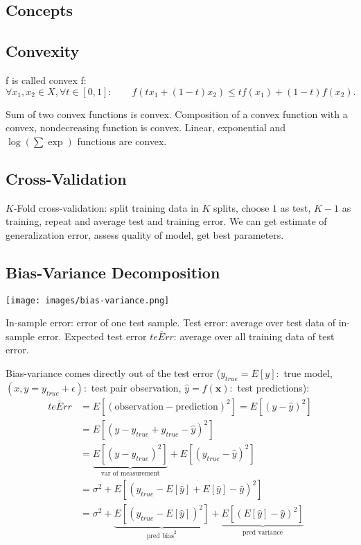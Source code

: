 \documentclass[10pt,a4paper,landscape]{article}
\renewcommand{\bf}[1]{\ensuremath{\mathbf{#1}}}
\begin{document}
\begin{multicols*}{4}
\section{Concepts}

\subsection{Convexity}
f is called convex f: $\forall x_1, x_2 \in X, \forall t \in [0, 1]: \qquad f(tx_1+(1-t)x_2)\leq t f(x_1)+(1-t)f(x_2).$

Sum of two convex functions is convex. Composition of a convex function with a convex, nondecreasing function is convex. Linear, exponential and $\log(\sum \exp)$ functions are convex.

\subsection{Cross-Validation}
$K$-Fold cross-validation: split training data in $K$ splits, choose $1$ as test, $K-1$ as training, repeat and average test and training error. We can get estimate of generalization error, assess quality of model, get best parameters.

\subsection{Bias-Variance Decomposition}
\begin{colfig}
  \centering
  \texttt{[image: images/bias-variance.png]}
\end{colfig}

In-sample error: error of one test sample. Test error: average over test data of in-sample error. Expected test error $\overline{teErr}$: average over all training data of test error. 

Bias-variance comes directly out of the test error ($y_{true}=E[y]:$ true model, $(x,y = y_{true} + \epsilon):$ test pair observation, $\hat{y}=f(\bf{x}):$ test predictions):
 \begin{align*}
 \overline{teErr}
 &= E[(\text{observation} - \text{prediction})^2] = E[(y - \hat{y})^2] \\
 &= E[(y - y_{true} + y_{true} - \hat{y})^2] \\
 &=\underbrace{E[(y - y_{true})^2]}_{\text{var of measurement}} + E[(y_{true} - \hat{y})^2] \\
 &=\sigma^2 + E[(y_{true} - E[\hat{y}] + E[\hat{y}] - \hat{y})^2] \\
 &=\sigma^2 + \underbrace{E[(y_{true} - E[\hat{y}])^2]}_{\text{pred bias}^2} +\underbrace{E[(E[\hat{y}] - \hat{y})^2]}_{\text{pred variance}}
\end{align*}


\end{multicols*}
\end{document}
